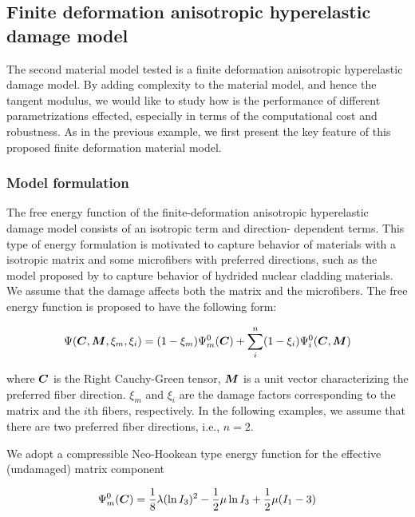 \documentclass[12pt]{article}
\numberwithin{equation}{section}
\begin{document}
\subsection{Finite deformation anisotropic hyperelastic damage model}
\label{subsec:anisotropic}

The second material model tested is a finite deformation anisotropic 
hyperelastic damage model. By adding complexity to the material model, 
and hence the tangent modulus, we would like to study how is the 
performance of different parametrizations effected, especially in 
terms of the computational cost and robustness. As in the previous 
example, we first present the key feature of this proposed finite 
deformation material model.

\subsubsection{Model formulation}
The free energy function of the finite-deformation anisotropic 
hyperelastic damage model consists of an isotropic term and direction-
dependent terms. This type of energy formulation is motivated to 
capture behavior of materials with a isotropic matrix and some 
microfibers with preferred directions, such as the model proposed by
\cite{Chen.etal:2014} to capture behavior of hydrided nuclear cladding 
materials. We assume that the damage affects both the matrix and the 
microfibers. The free energy function is proposed to have the 
following form:

\begin{equation}\label{eq:aniso_energy}
  \Psi ({\boldsymbol{C}}, {\boldsymbol{M}}, \xi_m, \xi_i) 
    = (1-\xi_m) \Psi_m^0({\boldsymbol{C}}) 
    + \sum_{i}^{n} (1-\xi_i)\Psi_i^0({\boldsymbol{C}}, {\boldsymbol{M}})
\end{equation}

where ${\boldsymbol{C}}$ is the Right Cauchy-Green tensor, ${\boldsymbol{M}}$ is a
unit vector characterizing the preferred fiber direction. $\xi_m$ and
$\xi_i$ are the damage factors corresponding to the matrix and the 
$i$th fibers, respectively. In the following examples, we assume that 
there are two preferred fiber directions, i.e., $n=2$.

We adopt a compressible Neo-Hookean type energy function for the 
effective (undamaged) matrix component

\begin{equation}\label{eq:aniso_Psim0}
  \Psi_m^0 ({\boldsymbol{C}}) 
    = \frac{1}{8}\lambda (\ln I_3)^2
    - \frac{1}{2}\mu \ln I_3 
    + \frac{1}{2}\mu( I_1 - 3)
\end{equation}
\end{document}

